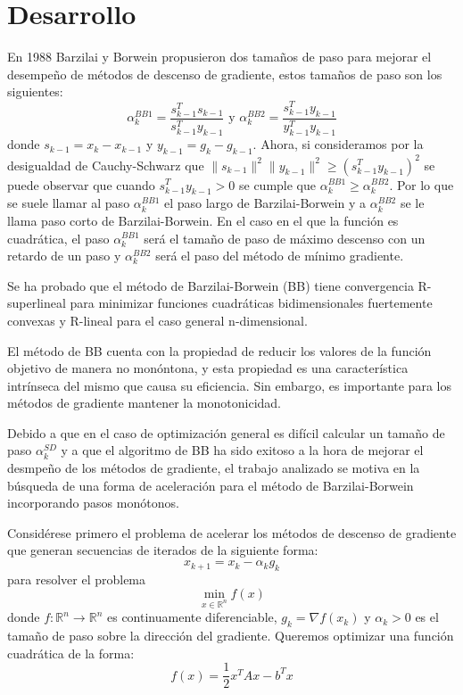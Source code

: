 \section*{Desarrollo}
En 1988 Barzilai y Borwein propusieron dos tamaños de paso para mejorar el desempeño de métodos de descenso de gradiente, estos tamaños de paso son los siguientes:
$$
\alpha^{BB1}_k = \frac{s^T_{k-1}s_{k-1}}{s^T_{k-1}y_{k-1}} \text{ y } \alpha_k^{BB2} = \frac{s_{k-1}^Ty_{k-1}}{y_{k-1}^Ty_{k-1}}
$$
donde $s_{k-1} = x_k - x_{k-1}$ y $y_{k-1} = g_k - g_{k-1}$. Ahora, si consideramos por la desigualdad de Cauchy-Schwarz que $\|s_{k-1}\|^2\|y_{k-1}\|^2 \geq (s_{k-1}^Ty_{k-1})^2$ se puede observar que cuando $s_{k-1}^Ty_{k-1}>0$ se cumple que $\alpha_k^{BB1} \geq \alpha_k^{BB2}$. Por lo que se suele llamar al paso $\alpha_k^{BB1}$ el paso largo de Barzilai-Borwein y a $\alpha_k^{BB2}$ se le llama paso corto de Barzilai-Borwein. En el caso en el que la función es cuadrática, el paso $\alpha_k^{BB1}$ será el tamaño de paso de máximo descenso con un retardo de un paso y $\alpha_k^{BB2}$ será el paso del método de mínimo gradiente.
\par Se ha probado que el método de Barzilai-Borwein (BB) tiene convergencia R-superlineal para minimizar funciones cuadráticas bidimensionales fuertemente convexas y R-lineal para el caso general n-dimensional.
\par El método de BB cuenta con la propiedad de reducir los valores de la función objetivo de manera no monóntona, y esta propiedad es una característica intrínseca del mismo que causa su eficiencia. Sin embargo, es importante para los métodos de gradiente mantener la monotonicidad.
\par Debido a que en el caso de optimización general es difícil calcular un tamaño de paso $\alpha_k^{SD}$ y a que el algoritmo de BB ha sido exitoso a la hora de mejorar el desmpeño de los métodos de gradiente, el trabajo analizado se motiva en la búsqueda de una forma de aceleración para el método de Barzilai-Borwein incorporando pasos monótonos. 
\par Considérese primero el problema de acelerar los métodos de descenso de gradiente que generan secuencias de iterados de la siguiente forma:
$$
	x_{k+1} = x_k - \alpha_kg_k
$$
para resolver el problema 
$$
	\min_{x\in\mathbb{R}^n}f(x)
$$
donde $f:\mathbb{R}^n \rightarrow \mathbb{R}^n$ es continuamente diferenciable, $g_k=\nabla f(x_k)$ y $\alpha_k>0$ es el tamaño de paso sobre la dirección del gradiente.
Queremos optimizar una función cuadrática de la forma:
$$
	f(x) = \frac{1}{2}x^TAx- b^Tx
$$
